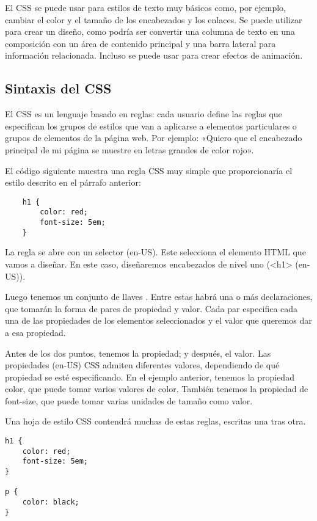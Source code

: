 El CSS se puede usar para estilos de texto muy básicos como, por ejemplo, cambiar el color y el tamaño de los encabezados y los enlaces. Se puede utilizar para crear un diseño, como podría ser convertir una columna de texto en una composición con un área de contenido principal y una barra lateral para información relacionada. Incluso se puede usar para crear efectos de animación.

\subsection{Sintaxis del CSS}
El CSS es un lenguaje basado en reglas: cada usuario define las reglas que especifican los grupos de estilos que van a aplicarse a elementos particulares o grupos de elementos de la página web. Por ejemplo: «Quiero que el encabezado principal de mi página se muestre en letras grandes de color rojo».

El código siguiente muestra una regla CSS muy simple que proporcionaría el estilo descrito en el párrafo anterior:

\begin{lstlisting}
	h1 {
		color: red;
		font-size: 5em;
	}
\end{lstlisting}

La regla se abre con un selector (en-US). Este selecciona el elemento HTML que vamos a diseñar. En este caso, diseñaremos encabezados de nivel uno (<h1> (en-US)).

Luego tenemos un conjunto de llaves { }. Entre estas habrá una o más declaraciones, que tomarán la forma de pares de propiedad y valor. Cada par especifica cada una de las propiedades de los elementos seleccionados y el valor que queremos dar a esa propiedad.

Antes de los dos puntos, tenemos la propiedad; y después, el valor. Las propiedades (en-US) CSS admiten diferentes valores, dependiendo de qué propiedad se esté especificando. En el ejemplo anterior, tenemos la propiedad color, que puede tomar varios valores de color. También tenemos la propiedad de font-size, que puede tomar varias unidades de tamaño como valor.

Una hoja de estilo CSS contendrá muchas de estas reglas, escritas una tras otra.

\begin{lstlisting}
h1 {
	color: red;
	font-size: 5em;
}

p {
	color: black;
}
\end{lstlisting}


